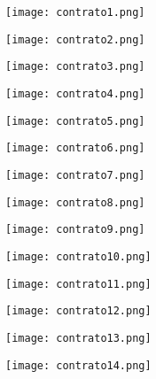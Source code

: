 \documentclass[12pt, spanish]{article}
\begin{document}
\begin{centering}\texttt{[image: contrato1.png]}\\[1.0 cm]\end{centering}
\begin{centering}\texttt{[image: contrato2.png]}\\[1.0 cm]\end{centering}
\begin{centering}\texttt{[image: contrato3.png]}\\[1.0 cm]\end{centering}
\begin{centering}\texttt{[image: contrato4.png]}\\[1.0 cm]\end{centering}
\begin{centering}\texttt{[image: contrato5.png]}\\[1.0 cm]\end{centering}
\begin{centering}\texttt{[image: contrato6.png]}\\[1.0 cm]\end{centering}
\begin{centering}\texttt{[image: contrato7.png]}\\[1.0 cm]\end{centering}
\begin{centering}\texttt{[image: contrato8.png]}\\[1.0 cm]\end{centering}
\begin{centering}\texttt{[image: contrato9.png]}\\[1.0 cm]\end{centering}
\begin{centering}\texttt{[image: contrato10.png]}\\[1.0 cm]\end{centering}
\begin{centering}\texttt{[image: contrato11.png]}\\[1.0 cm]\end{centering}
\begin{centering}\texttt{[image: contrato12.png]}\\[1.0 cm]\end{centering}
\begin{centering}\texttt{[image: contrato13.png]}\\[1.0 cm]\end{centering}
\begin{centering}\texttt{[image: contrato14.png]}\\[1.0 cm]\end{centering}
\end{document}
